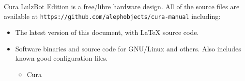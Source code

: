 %
%
%
%
%

Cura LulzBot\textsuperscript{\miniscule{\texttrademark}} Edition is a free/libre hardware design. All of the source files are available at \texttt{https://github.com/alephobjects/cura-manual} including:

\begin{itemize}
\item The latest version of this document, with {\LaTeX} source code.


\item Software binaries and source code for GNU/Linux and others. Also includes known good configuration files.
\begin{itemize} %
\item{Cura}
\end{itemize} %

\end{itemize}

